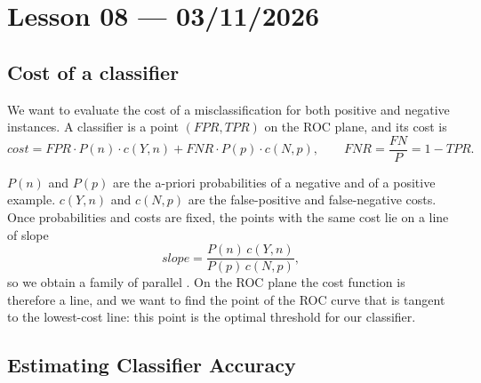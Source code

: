 \section{Lesson 08 --- 03/11/2026}

\subsection{Cost of a classifier}

We want to evaluate the cost of a misclassification for both positive and negative instances. A classifier is a point $(FPR, TPR)$ on the ROC plane, and its cost is
\[
  cost = FPR \cdot P(n) \cdot c(Y,n) + FNR \cdot P(p) \cdot c(N,p),
  \qquad FNR = \frac{FN}{P} = 1 - TPR.
\]

$P(n)$ and $P(p)$ are the a-priori probabilities of a negative and of a positive example. $c(Y,n)$ and $c(N,p)$ are the false-positive and false-negative costs. Once probabilities and costs are fixed, the points with the same cost lie on a line of slope
\[
  slope = \frac{P(n)\, c(Y,n)}{P(p)\, c(N,p)},
\]
so we obtain a family of parallel . On the ROC plane the cost function is therefore a line, and we want to find the point of the ROC curve that is tangent to the lowest-cost line: this point is the optimal threshold for our classifier.

\begin{center}
\end{center}

\subsection{Estimating Classifier Accuracy}

